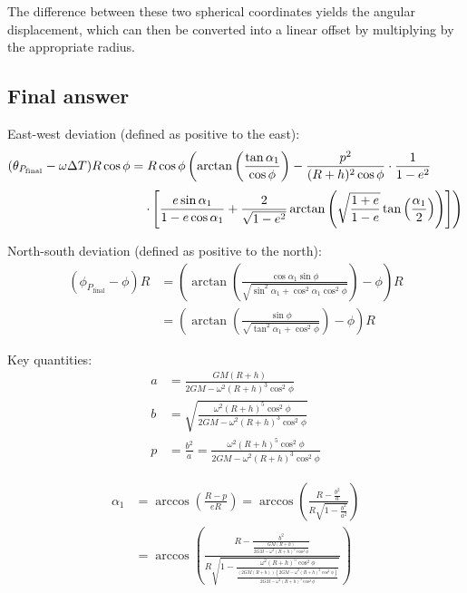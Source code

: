 \documentclass[11pt,en]{elegantpaper}
\begin{document}
The difference between these two spherical coordinates yields the angular displacement,  
which can then be converted into a linear offset by multiplying by the appropriate radius.


\subsection{Final answer}

East-west deviation (defined as positive to the east):
\begin{align}
    (\theta_{P_\text{final}} - \omega \Delta T)R\cos\phi 
    &= R\cos\phi \left( 
        \arctan\left( \frac{\tan\alpha_1}{\cos\phi} \right) 
        - \frac{p^2}{(R + h)^2 \cos\phi} \cdot \frac{1}{1 - e^2}
    \right. \notag \\[3pt]
    &\quad\left.
        \cdot \left[
            \frac{e\sin\alpha_1}{1 - e\cos\alpha_1}
            + \frac{2}{\sqrt{1 - e^2}} 
              \arctan\left( 
                \sqrt{\frac{1 + e}{1 - e}} \tan\left( \frac{\alpha_1}{2} \right)
              \right)
        \right]
    \right)
\end{align}


\vspace{1em}

North-south deviation (defined as positive to the north):
\begin{align}
    (\phi_{P_\text{final}} - \phi)R 
    &= \left( 
        \arctan\left( \frac{\cos\alpha_1\sin\phi}{\sqrt{\sin^{2}\alpha_1+\cos^{2}\alpha_1\cos^{2}\phi}} \right)
        - \phi 
    \right) R \\[5pt]
    &= \left(
        \arctan\left( \frac{\sin\phi}{\sqrt{\tan^{2}\alpha_1+\cos^{2}\phi}} \right)
        - \phi 
    \right) R
\end{align}

\vspace{1em}

Key quantities:
\begin{align}
    a &= \frac{GM(R + h)}{2GM - \omega^2(R + h)^3 \cos^2\phi} \\[5pt]
    b &= \sqrt{ \frac{\omega^2 (R + h)^5 \cos^2\phi}{2GM - \omega^2(R + h)^3 \cos^2\phi} } \\[5pt]
    p &= \frac{b^2}{a} = \frac{ \omega^2 (R + h)^5 \cos^2\phi }{2GM - \omega^2(R + h)^3 \cos^2\phi}
\end{align}

\begin{align}
    \alpha_1 
    &= \arccos\left( \frac{R - p}{eR} \right)
    = \arccos\left( \frac{R - \frac{b^2}{a}}{R \sqrt{1 - \frac{b^2}{a^2}}} \right) \\[5pt]
    &= \arccos\left(
        \frac{R - \frac{b^2}{\frac{GM (R + h)}{2GM - \omega^2 (R + h)^3 \cos^2\phi}}}
        {R \sqrt{1 - 
        \frac{\omega^2 (R + h)^5 \cos^2\phi}
        {\frac{(2GM(R + h))(2GM - \omega^2 (R + h)^3 \cos^2\phi)}{2GM - \omega^2 (R + h)^3 \cos^2\phi}}}} 
    \right)
\end{align}
\end{document}
